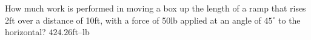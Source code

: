 {How much work is performed in moving a box up the length of a ramp that rises 2ft over a distance of 10ft, with a force of 50lb applied at an angle of $45^\circ$ to the horizontal?
}
{$424.26$ft--lb
}
